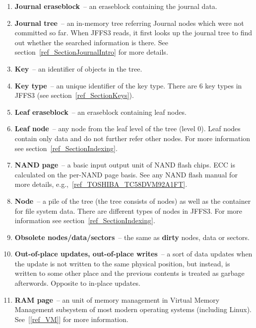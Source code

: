 \begin{enumerate}
\item \textbf{Journal eraseblock}~-- an eraseblock containing the journal data.

\item \textbf{Journal tree}~-- an \mbox{in-memory} tree referring Journal nodes
which were not committed so far. When JFFS3 reads, it first looks up the
journal tree to find out whether the searched information is there. See
section~\ref{ref_SectionJournalIntro} for more details.

\item \textbf{Key}~-- an identifier of objects in the tree.

\item \textbf{Key type}~-- an unique identifier of the key type. There are
6 key types in JFFS3 (see section~\ref{ref_SectionKeys}).

\item \textbf{Leaf eraseblock}~-- an eraseblock containing leaf nodes.

\item \textbf{Leaf node}~-- any node from the leaf level of the tree (level 0).
Leaf nodes contain only data and do not further refer other nodes. For more
information see section~\ref{ref_SectionIndexing}.

\item \textbf{NAND page}~-- a basic input output unit of NAND flash chips. ECC
is calculated on the \mbox{per-NAND} page basis. See any NAND flash manual for
more details, e.g.,~\ref{ref_TOSHIBA_TC58DVM92A1FT}.

\item \textbf{Node}~-- a pile of the tree (the tree consists of nodes) as well
as the container for file system data. There are different types of nodes in
JFFS3. For more information see section~\ref{ref_SectionIndexing}.

\item \textbf{Obsolete nodes/data/sectors}~-- the same as \textbf{dirty} nodes,
data or sectors.

\item \textbf{Out-of-place updates, out-of-place writes}~-- a sort of data
updates when the update is not written to the same physical position, but
instead, is written to some other place and the previous contents is treated as
garbage afterwords. Opposite to \mbox{in-place} updates.

\item \textbf{RAM page}~-- an unit of memory management in Virtual
Memory Management subsystem of most modern operating systems (including Linux).
See~[\ref{ref_VM}] for more information.


\end{enumerate}
